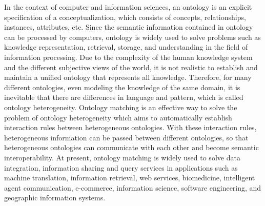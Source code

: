 \documentclass[twoside]{article}
\begin{document}
In the context of computer and information sciences, an ontology is an explicit specification of a conceptualization\cite{wwy1,wwy2}, which consists of concepts, relationships, instances, attributes, etc.
Since the semantic information contained in ontology can be processed by computers, ontology is widely used to solve problems such as knowledge representation, retrieval, storage, and understanding in the field of information processing.
Due to the complexity of the human knowledge system and the different subjective views of the world, it is not realistic to establish and maintain a unified ontology that represents all knowledge.
Therefore, for many different ontologies, even modeling the knowledge of the same domain, it is inevitable that there are differences in language and pattern, which is called ontology heterogeneity.
Ontology matching is an effective way to solve the problem of ontology heterogeneity which aims to automatically establish interaction rules between heterogeneous ontologies.
With these interaction rules, heterogeneous information can be passed between different ontologies, so that heterogeneous ontologies can communicate with each other and become semantic interoperability.
At present, ontology matching is widely used to solve data integration, information sharing and query services in applications such as machine translation, information retrieval, web services, biomedicine, intelligent agent communication, e-commerce, information science, software engineering, and geographic information systems\cite{wwy10,wwy11,wwy12,wwy13}.
\end{document}
